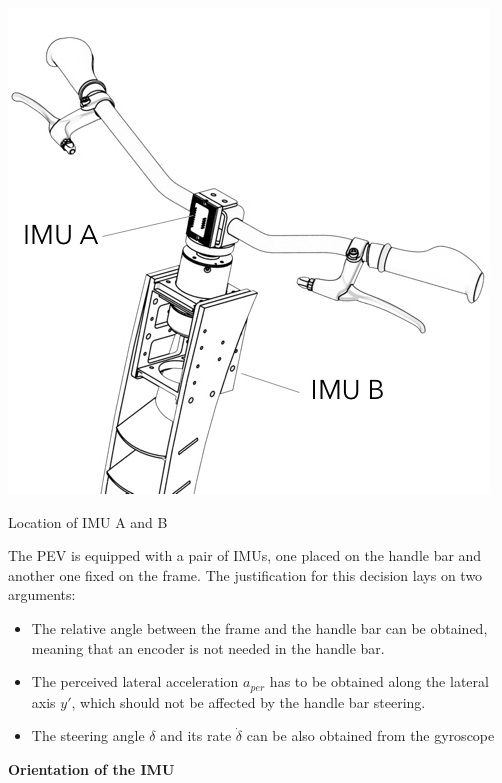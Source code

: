 \begin{marginfigure}[0cm]
	\includegraphics[width=1.2\linewidth]{figs/05/IMU_Overall}
	\caption{Location of IMU A and B}
\end{marginfigure}
The PEV is equipped with a pair of IMUs, one placed on the handle bar and another one fixed on the frame. The justification for this decision lays on two arguments:
\begin{itemize}
\begin{itemize}
\item The relative angle between the frame and the handle bar can be obtained, meaning that an encoder is not needed in the handle bar.
\item The perceived lateral acceleration $a_{per}$ has to be obtained along the lateral axis $y'$, which should not be affected by the handle bar steering.
\item The steering angle $\delta$ and its rate $\dot{\delta}$ can be also obtained from the gyroscope
\end{itemize}
\end{itemize}

\textbf{Orientation of the IMU}

